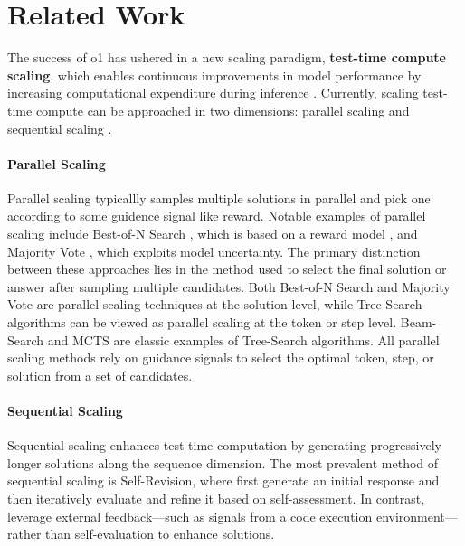 \section{Related Work}
The success of o1 has ushered in a new scaling paradigm, \textbf{test-time compute scaling}, which enables continuous improvements in model performance by increasing computational expenditure during inference \citep{o1_blog,o1_system_card}. Currently, scaling test-time compute can be approached in two dimensions: parallel scaling and sequential scaling \citep{Scaling_test_time_compute,o1-roadmap}. 
\paragraph{Parallel Scaling}
Parallel scaling typicallly samples multiple solutions in parallel and pick one according to some guidence signal like reward. Notable examples of parallel scaling include Best-of-N Search \citep{OpenAIMathVerifierORM,Speculative_bon,BoNBoN,Variational_bon,BOND}, which is based on a reward model \citep{OpenAIMathVerifierORM,VerifySbyS}, and Majority Vote \citep{SC}, which exploits model uncertainty. The primary distinction between these approaches lies in the method used to select the final solution or answer after sampling multiple candidates. Both Best-of-N Search and Majority Vote are parallel scaling techniques at the solution level, while Tree-Search algorithms can be viewed as parallel scaling at the token or step level. Beam-Search \citep{TreeBoN,OVM,Self_evaluation_guided_beam_search,stochastic_beam_search} and MCTS \citep{RAP,Alpha-zero-like,AlphaMath,MCTS_for_code_generation} are classic examples of Tree-Search algorithms. All parallel scaling methods rely on guidance signals to select the optimal token, step, or solution from a set of candidates. 


\paragraph{Sequential Scaling}
Sequential scaling enhances test-time computation by generating progressively longer solutions along the sequence dimension. The most prevalent method of sequential scaling is Self-Revision, where \citet{Self_refine} first generate an initial response and then iteratively evaluate and refine it based on self-assessment. In contrast, \citet{self_debug,Critic} leverage external feedback—such as signals from a code execution environment—rather than self-evaluation to enhance solutions.


